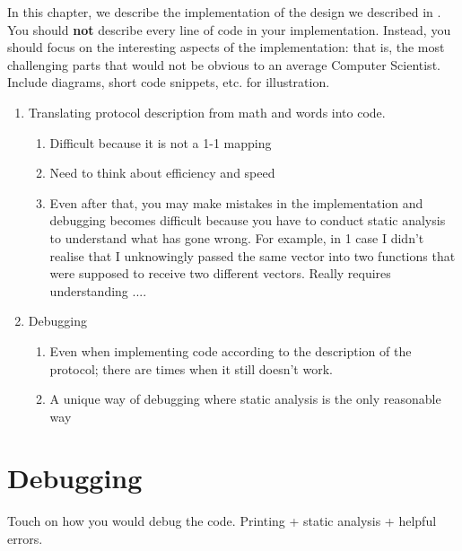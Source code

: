 In this chapter, we describe the implementation of the design we described in . 
You should \textbf{not} describe every line of code in your implementation. Instead, you should focus 
on the interesting aspects of the implementation: that is, the most challenging parts that would not 
be obvious to an average Computer Scientist. Include diagrams, short code snippets, etc. for 
illustration. 

\begin{enumerate}
    \item Translating protocol description from math and words into code.
    \begin{enumerate}
        \item Difficult because it is not a 1-1 mapping
        \item Need to think about efficiency and speed
        \item Even after that, you may make mistakes in the implementation and debugging becomes difficult because you have to conduct static analysis to understand what has gone wrong. For example, in 1 case I didn't realise that I unknowingly passed the same vector into two functions that were supposed to receive two different vectors. Really requires understanding ....
    \end{enumerate}
    \item Debugging 
    \begin{enumerate}
        \item Even when implementing code according to the description of the protocol; there are times when it still doesn't work.
        \item A unique way of debugging where static analysis is the only reasonable way
    \end{enumerate}
\end{enumerate}


\section{Debugging}

Touch on how you would debug the code. Printing + static analysis + helpful errors. 